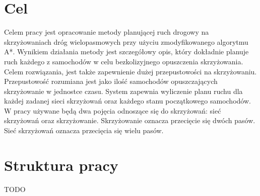 \section{Cel}

Celem pracy jest opracowanie metody planującej ruch drogowy na skrzyżowaniach dróg wielopasmowych przy użyciu zmodyfikowanego algorytmu A*. Wynikiem działania metody jest szczegółowy opis, który dokładnie planuje ruch każdego z samochodów w celu bezkolizyjnego opuszczenia skrzyżowania. Celem rozwiązania, jest także zapewnienie dużej przepustowości na skrzyżowaniu. Przepustowość rozumiana jest jako ilość samochodów opuszczających skrzyżowanie w jednostce czasu. System zapewnia wyliczenie planu ruchu dla każdej zadanej sieci skrzyżowań oraz każdego stanu początkowego samochodów.
\newline
\indent
W pracy używane będą dwa pojęcia odnoszące się do skrzyżowań: sieć skrzyżowań oraz skrzyżowanie. Skrzyżowanie oznacza przecięcie się dwóch pasów. Sieć skrzyżowań oznacza przecięcia się wielu pasów.

\section{Struktura pracy}
TODO
